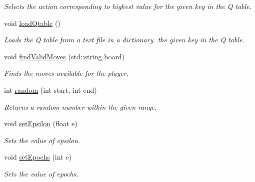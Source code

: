 \begin{DoxyCompactItemize}
\begin{DoxyCompactList}\small\item\em Selects the action corresponding to highest value for the given key in the Q table. \end{DoxyCompactList}\item 
\mbox{\label{classQLearning_aeb4bf82527ce560204a29ff3acf31b87}} 
void \mbox{\hyperlink{classQLearning_aeb4bf82527ce560204a29ff3acf31b87}{load\+Qtable}} ()
\begin{DoxyCompactList}\small\item\em Loads the Q table from a text file in a dictionary. the given key in the Q table. \end{DoxyCompactList}\item 
void \mbox{\hyperlink{classQLearning_ae2fc8cc1e5c59d2eea29d2d754e2a61f}{find\+Valid\+Moves}} (std\+::string board)
\begin{DoxyCompactList}\small\item\em Finds the moves available for the player. \end{DoxyCompactList}\item 
int \mbox{\hyperlink{classQLearning_adc9c1b48116868a468ec370cc2dc3475}{random}} (int start, int end)
\begin{DoxyCompactList}\small\item\em Returns a random number within the given range. \end{DoxyCompactList}\item 
void \mbox{\hyperlink{classQLearning_a818c5eab3884a6e8be30d32c5d5305f5}{set\+Epsilon}} (float e)
\begin{DoxyCompactList}\small\item\em Sets the value of epsilon. \end{DoxyCompactList}\item 
void \mbox{\hyperlink{classQLearning_a6946b885339af03e3c36b5e8e57ce617}{set\+Epochs}} (int e)
\begin{DoxyCompactList}\small\item\em Sets the value of epochs. \end{DoxyCompactList}\end{DoxyCompactItemize}
